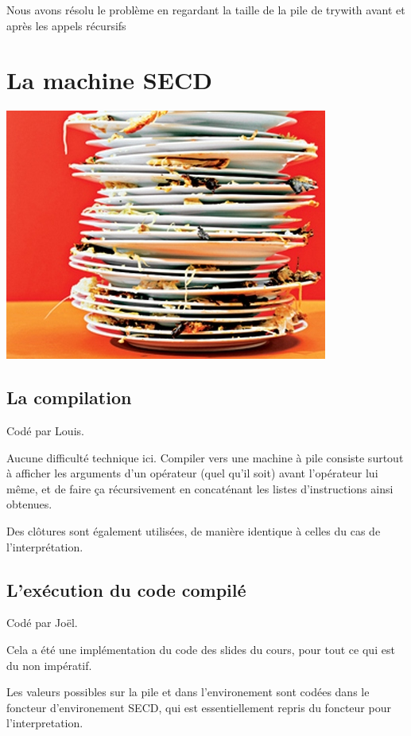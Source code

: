 \documentclass[a4paper,10pt]{report}
\begin{document}
Nous avons résolu le problème en regardant la taille de la pile de trywith avant et après les appels récursifs

\chapter*{La machine SECD}

\begin{center}
\includegraphics[scale=0.7]{dirty-dishes.jpg} 
\end{center}

\section{La compilation}  
Codé par Louis.

Aucune difficulté technique ici. Compiler vers une machine à pile consiste surtout à afficher les arguments d'un opérateur (quel qu'il soit) avant l'opérateur lui même, et de faire ça récursivement en concaténant les listes d'instructions ainsi obtenues.  
  
Des clôtures sont également utilisées, de manière identique à celles du cas de l'interprétation.  

\section{L'exécution du code compilé}
Codé par Joël. 
 
Cela a été une implémentation du code des slides du cours, pour tout ce qui est du non impératif.

Les valeurs possibles sur la pile et dans l'environement sont codées dans le foncteur d'environement SECD, qui est essentiellement repris du foncteur pour l'interpretation. 
\end{document}
